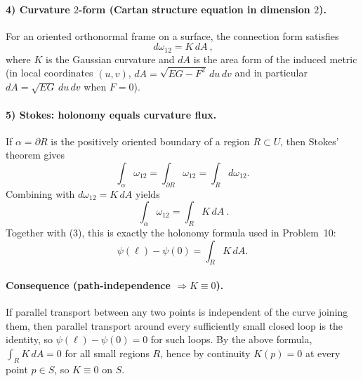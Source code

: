 \documentclass[12pt,a4paper]{article}
\theoremstyle{plain}
\theoremstyle{definition}      %
\begin{document}
	\paragraph{4) Curvature $2$-form (Cartan structure equation in dimension $2$).}
	For an oriented orthonormal frame on a surface, the connection form satisfies
	\[
	\boxed{\ d\omega_{12}=K\,dA\ },
	\]
	where $K$ is the Gaussian curvature and $dA$ is the area form of the induced metric
	(in local coordinates $(u,v)$, $dA=\sqrt{EG-F^2}\,du\,dv$ and in particular $dA=\sqrt{EG}\,du\,dv$ when $F=0$).
	
	\paragraph{5) Stokes: holonomy equals curvature flux.}
	If $\alpha=\partial R$ is the positively oriented boundary of a region $R\subset U$, then Stokes' theorem gives
	\[
	\int_\alpha \omega_{12}=\int_{\partial R}\omega_{12}=\int_R d\omega_{12}.
	\]
	Combining with $d\omega_{12}=K\,dA$ yields
	\[
	\boxed{\ \int_\alpha \omega_{12}=\int_R K\,dA\ }.
	\]
	Together with (3), this is exactly the holonomy formula used in Problem~10:
	\[
	\psi(\ell)-\psi(0)=\int_R K\,dA.
	\]
	
	\paragraph{Consequence (path-independence $\Rightarrow K\equiv 0$).}
	If parallel transport between any two points is independent of the curve joining them, then parallel transport around
	every sufficiently small closed loop is the identity, so $\psi(\ell)-\psi(0)=0$ for such loops.
	By the above formula, $\int_R K\,dA=0$ for all small regions $R$, hence by continuity $K(p)=0$ at every point $p\in S$,
	so $K\equiv 0$ on $S$.
	
	
	
	
\end{document}
